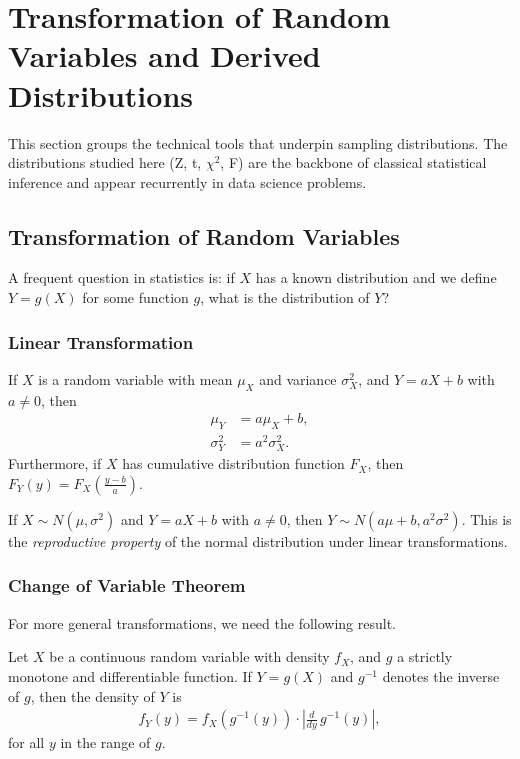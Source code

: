 \section{Transformation of Random Variables and Derived Distributions}

This section groups the technical tools that underpin sampling distributions. The distributions studied here (Z, t, $\chi^2$, F) are the backbone of classical statistical inference and appear recurrently in data science problems.


\subsection{Transformation of Random Variables}

A frequent question in statistics is: if $X$ has a known distribution and we define $Y = g(X)$ for some function $g$, what is the distribution of $Y$?

\subsubsection{Linear Transformation}

\begin{teorema}
If $X$ is a random variable with mean $\mu_X$ and variance $\sigma_X^2$, and $Y = aX + b$ with $a \neq 0$, then
\begin{align}
 \label{eq:3.2.1}
 \mu_Y &= a\mu_X + b, \\
 \label{eq:3.2.2}
 \sigma_Y^2 &= a^2\sigma_X^2.
\end{align}
Furthermore, if $X$ has cumulative distribution function $F_X$, then
$F_Y(y) = F_X\!\left(\frac{y-b}{a}\right)$.
\end{teorema}

\begin{ejemplo}
 \label{exmp:3.2.1}
If $X \sim N(\mu, \sigma^2)$ and $Y = aX + b$ with $a \neq 0$, then
$Y \sim N(a\mu + b, a^2\sigma^2)$. This is the \emph{reproductive property} of the normal distribution under linear transformations.
\end{ejemplo}

\subsubsection{Change of Variable Theorem}

For more general transformations, we need the following result.

\begin{teorema}
Let $X$ be a continuous random variable with density $f_X$, and $g$ a strictly monotone and differentiable function. If $Y = g(X)$ and $g^{-1}$ denotes the inverse of $g$, then the density of $Y$ is
\begin{align}
 \label{eq:3.2.3}
 f_Y(y) = f_X\!\left(g^{-1}(y)\right) \cdot \left|\frac{d}{dy}\,g^{-1}(y)\right|,
\end{align}
for all $y$ in the range of $g$.
\end{teorema}

